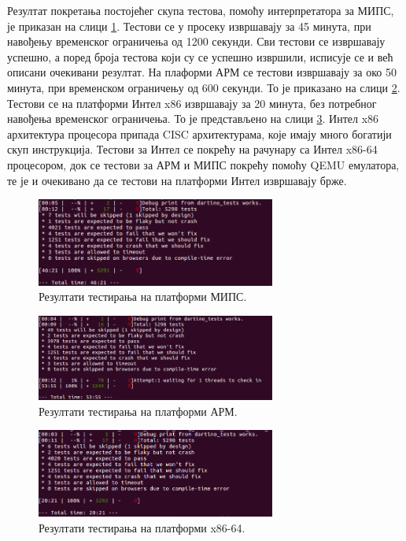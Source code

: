 \documentclass[12pt,oneside]{memoir}
\begin{document}
Резултат покретања постојећег скупа тестова, помоћу интерпретатора за МИПС, је приказан на слици \ref{fig:mips}. Тестови се у просеку извршавају за 45 минута, при навођењу временског ограничења од 1200 секунди. Сви тестови се извршавају успешно, а поред броја тестова који су се успешно извршили, исписује се и већ описани очекивани резултат. На плаформи АРМ се тестови извршавају за око 50 минута, при временском ограничењу од 600 секунди. То је приказано на слици \ref{fig:arm}.
Тестови се на платформи Интел x86 извршавају за 20 минута, без потребног навођења временског ограничења. То је представљено на слици \ref{fig:x86}. Интел x86 архитектура процесора припада CISC архитектурама, које имају много богатији скуп инструкција. Тестови за Интел се покрећу на рачунару са Интел x86-64 процесором, док се тестови за АРМ и МИПС покрећу помоћу QEMU емулатора, те је и очекивано да се тестови на платформи Интел извршавају брже.

\begin{figure}[!ht]
  \centering
  \includegraphics[width=0.7\textwidth]{testovi-mips.png}
  \caption{Резултати тестирања на платформи МИПС.}
  \label{fig:mips}
\end{figure}

\begin{figure}[!ht]
  \centering
  \includegraphics[width=0.7\textwidth]{testovi-arm.png}
  \caption{Резултати тестирања на платформи АРМ.}
  \label{fig:arm}
\end{figure}

\begin{figure}[!ht]
  \centering
  \includegraphics[width=0.7\textwidth]{testovi_x64.png}
  \caption{Резултати тестирања на платформи x86-64.}
  \label{fig:x86}
\end{figure}
\end{document}
